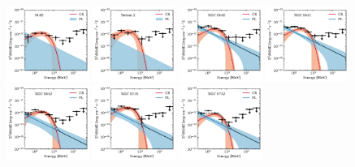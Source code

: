 \documentclass[doublespace,nopageskip]{VTthesis} %
\begin{document}
\begin{appendices}
\begin{figure}
\centering
\includegraphics[width=0.24\textwidth]{Figures/Globular/spectra/2comp_8.pdf}
\includegraphics[width=0.24\textwidth]{Figures/Globular/spectra/2comp_28.pdf}
\includegraphics[width=0.24\textwidth]{Figures/Globular/spectra/2comp_18.pdf}
\includegraphics[width=0.24\textwidth]{Figures/Globular/spectra/2comp_19.pdf}
\includegraphics[width=0.24\textwidth]{Figures/Globular/spectra/2comp_22.pdf}
\includegraphics[width=0.24\textwidth]{Figures/Globular/spectra/2comp_13.pdf}
\includegraphics[width=0.24\textwidth]{Figures/Globular/spectra/2comp_24.pdf}

\end{figure}
\end{appendices}
\end{document}
